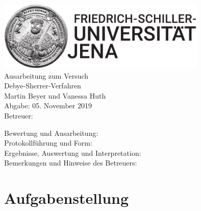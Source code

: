\documentclass[a4paper,twoside,final]{article}
\begin{document}
\setlength{\marginparsep}{2em}
\renewcommand{\theequation}{\arabic{section}.\arabic{equation}}
\renewcommand{\thefigure}{\arabic{section}.\arabic{figure}}
\renewcommand{\thetable}{\arabic{section}.\arabic{table}}

\begin{center}
\thispagestyle{empty}
  \includegraphics[width=0.75\textwidth]{UniJena_BildWortMarke_black.pdf}\\[4em]
  \Large
  Ausarbeitung zum Versuch\\[2em]
  \Huge
  Debye-Sherrer-Verfahren\\
  \vspace{2cm}
  \Large
  Martin Beyer und Vanessa Huth\\[2em]
  Abgabe: 05. November 2019\\[2em]
  Betreuer:\\[5em]
  \begin{flushleft}
  	Bewertung und Ausarbeitung:\\[2em]
		Protokollführung und Form:\\[1em]
		Ergebnisse, Auswertung und Interpretation:\\[1em]
		Bemerkungen und Hinweise des Betreuers:
  \end{flushleft}
\end{center}
\clearpage

\pagestyle{fancy}
\renewcommand{\headrulewidth}{0pt}
\renewcommand{\footrulewidth}{0.5pt}
\renewcommand{\sectionmark}[1]{\markright{#1}}
\fancyhead[RE,LO]{\rightmark}
\fancyfoot[LE,RO]{\bfseries\thepage}
\renewcommand{\headrulewidth}{0.5pt}
\renewcommand{\footrulewidth}{0.5pt}

\setcounter{equation}{0}
\setcounter{figure}{0}


\section{Aufgabenstellung} \label{sec:Aufgabenstellung}
\end{document}
